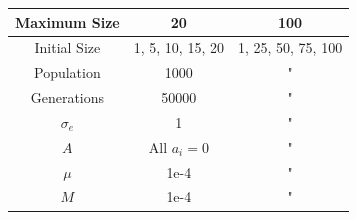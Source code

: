 \documentclass[paper=a4, fontsize=11pt,twoside]{scrartcl}       %
\begin{document}
\begin{center}
    \begin{tabular}{ | c | c | c | }
        \hline
	Maximum Size & 20 & 100 \\ \hline
	Initial Size & 1, 5, 10, 15, 20 & 1, 25, 50, 75, 100 \\ \hline
	Population & 1000 & " \\ \hline
	Generations & 50000 & " \\ \hline
	$\sigma_e$ & 1 & " \\ \hline
	$A$ & All $a_i = 0$ & " \\ \hline
	$\mu$  & 1e-4 & " \\ \hline
	$M$ & 1e-4 & " \\ \hline
    \end{tabular}
\end{center}
\end{document}
